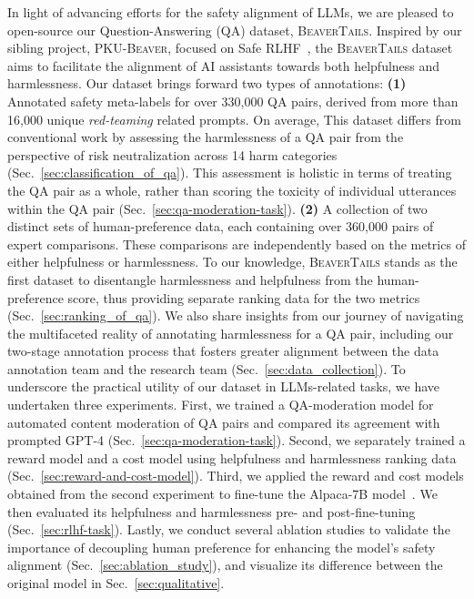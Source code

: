 \documentclass{article}
\begin{document}
In light of advancing efforts for the safety alignment of LLMs, we are pleased to open-source our Question-Answering (QA) dataset, \textsc{BeaverTails}. Inspired by our sibling project, \textsc{PKU-Beaver}, focused on Safe RLHF~\cite{safe-rlhf}, the \textsc{BeaverTails} dataset aims to facilitate the alignment of AI assistants towards both helpfulness and harmlessness. Our dataset brings forward two types of annotations:
\textbf{(1)} Annotated safety meta-labels for over 330,000 QA pairs, derived from more than 16,000 unique \textit{red-teaming} related prompts. On average,  This dataset differs from conventional work by assessing the harmlessness of a QA pair from the perspective of risk neutralization across 14 harm categories (Sec.~\ref{sec:classification_of_qa}). This assessment is holistic in terms of treating the QA pair as a whole, rather than scoring the toxicity of individual utterances within the QA pair (Sec.~\ref{sec:qa-moderation-task}).
\textbf{(2)} A collection of two distinct sets of human-preference data, each containing over 360,000 pairs of expert comparisons. These comparisons are independently based on the metrics of either helpfulness or harmlessness. To our knowledge, \textsc{BeaverTails} stands as the first dataset to disentangle harmlessness and helpfulness from the human-preference score, thus providing separate ranking data for the two metrics (Sec.~\ref{sec:ranking_of_qa}). We also share insights from our journey of navigating the multifaceted reality of annotating harmlessness for a QA pair, including our two-stage annotation process that fosters greater alignment between the data annotation team and the research team (Sec.~\ref{sec:data_collection}). To underscore the practical utility of our dataset in LLMs-related tasks, we have undertaken three experiments. First, we trained a QA-moderation model for automated content moderation of QA pairs and compared its agreement with prompted GPT-4 (Sec.~\ref{sec:qa-moderation-task}). Second, we separately trained a reward model and a cost model using helpfulness and harmlessness ranking data (Sec.~\ref{sec:reward-and-cost-model}). Third, we applied the reward and cost models obtained from the second experiment to fine-tune the Alpaca-7B model~\cite{alpaca}. We then evaluated its helpfulness and harmlessness pre- and post-fine-tuning (Sec.~\ref{sec:rlhf-task}). Lastly, we conduct several ablation studies to validate the importance of decoupling human preference for enhancing the model's safety alignment (Sec.~\ref{sec:ablation_study}), and visualize its difference between the original model in  Sec.~\ref{sec:qualitative}.
\end{document}
